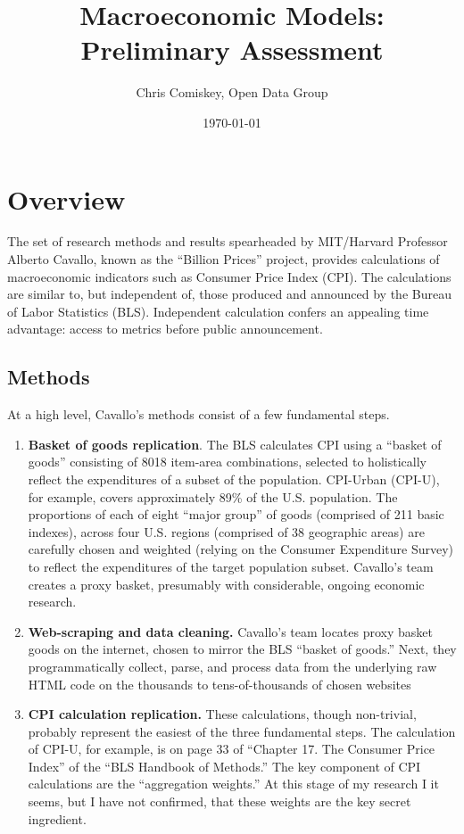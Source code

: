 \documentclass{article}
\title{Macroeconomic Models: \\ Preliminary Assessment}
\author{Chris Comiskey, Open Data Group}
\date{\today}
\begin{document}
\maketitle{}

\section*{Overview}
The set of research methods and results spearheaded by MIT/Harvard Professor Alberto Cavallo, known as the ``Billion Prices'' project, provides calculations of macroeconomic indicators such as Consumer Price Index (CPI). The calculations are similar to, but independent of, those produced and announced by the Bureau of Labor Statistics (BLS). Independent calculation confers an appealing time advantage: access to metrics before public announcement. 

\subsection*{Methods}
At a high level, Cavallo's methods consist of a few fundamental steps.
\begin{enumerate}
\item {\bf Basket of goods replication}.
The BLS calculates CPI using a ``basket of goods'' consisting of 8018 item-area combinations, selected to holistically reflect the expenditures of a subset of the population. CPI-Urban (CPI-U), for example, covers approximately 89\% of the U.S. population. The proportions of each of eight ``major group'' of goods (comprised of 211 basic indexes), across four U.S. regions (comprised of 38 geographic areas) are carefully chosen and weighted (relying on the Consumer Expenditure Survey) to reflect the expenditures of the target population subset. Cavallo's team creates a proxy basket, presumably with considerable, ongoing economic research.
\item {\bf Web-scraping and data cleaning.}
Cavallo's team locates proxy basket goods on the internet, chosen to mirror the BLS ``basket of goods.'' Next, they programmatically collect, parse, and process data from the underlying raw HTML code on the thousands to tens-of-thousands of chosen websites  
\item {\bf CPI calculation replication.}
These calculations, though non-trivial, probably represent the easiest of the three fundamental steps. The calculation of CPI-U, for example, is on page 33 of ``Chapter 17. The Consumer Price Index'' of the ``BLS Handbook of Methods.'' The key component of CPI calculations are the ``aggregation weights.'' At this stage of my research I it seems, but I have not confirmed, that these weights are the key secret ingredient.
\end{enumerate}
\end{document}
